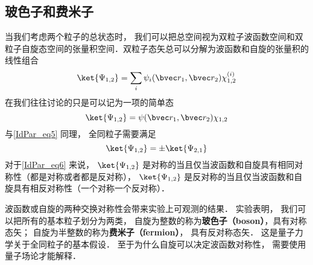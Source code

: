 \subsection{玻色子和费米子}
当我们考虑两个粒子的总状态时， 我们可以把总空间视为双粒子波函数空间和双粒子自旋态空间的张量积空间．双粒子态矢总可以分解为波函数和自旋的张量积的线性组合 %
\begin{equation}\label{IdPar_eq8}
\ket{\Psi_{1,2}} = \sum_i \psi_i(\bvec r_1, \bvec r_2) \chi^{(i)}_{1,2}
\end{equation}
在我们往往讨论的只是可以记为一项的简单态
\begin{equation}\label{IdPar_eq6}
\ket{\Psi_{1,2}} = \psi(\bvec r_1, \bvec r_2) \chi_{1,2}
\end{equation}
与\autoref{IdPar_eq5} 同理， 全同粒子需要满足
\begin{equation}\label{IdPar_eq4}
\ket{\Psi_{1,2}} = \pm \ket{\Psi_{2,1}}
\end{equation}
对于\autoref{IdPar_eq6} 来说， $\ket{\Psi_{1,2}}$ 是对称的当且仅当波函数和自旋具有相同对称性（都是对称或者都是反对称）， $\ket{\Psi_{1,2}}$ 是反对称的当且仅当波函数和自旋具有相反对称性（一个对称一个反对称）．

波函数或自旋的两种交换对称性会带来实验上可观测的结果． 实验表明， 我们可以把所有的基本粒子划分为两类， 自旋为整数的称为\textbf{玻色子（boson）}，具有对称态矢； 自旋为半整数的称为\textbf{费米子（fermion）}， 具有反对称态矢． 这是量子力学关于全同粒子的基本假设． 至于为什么自旋可以决定波函数对称性， 需要使用量子场论才能解释． %

